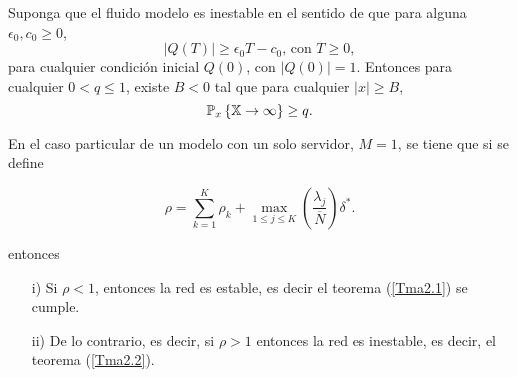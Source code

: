\begin{Teo}\label{Tma2.2}
Suponga que el fluido modelo es inestable en el sentido de que
para alguna $\epsilon_{0},c_{0}\geq0$,
\begin{equation}\label{Eq.Inestability}
|Q\left(T\right)|\geq\epsilon_{0}T-c_{0}\textrm{, con }T\geq0,
\end{equation}
para cualquier condici\'on inicial $Q\left(0\right)$, con
$|Q\left(0\right)|=1$. Entonces para cualquier $0<q\leq1$, existe
$B<0$ tal que para cualquier $|x|\geq B$,
\begin{equation}
\mathbb{P}_{x}\left\{\mathbb{X}\rightarrow\infty\right\}\geq q.
\end{equation}
\end{Teo}

En el caso particular de un modelo con un solo servidor, $M=1$, se
tiene que si se define
\begin{Def}\label{Def.Ro}
\begin{equation}\label{RoM1}
\rho=\sum_{k=1}^{K}\rho_{k}+\max_{1\leq j\leq
K}\left(\frac{\lambda_{j}}{\overline{N}}\right)\delta^{*}.
\end{equation}
\end{Def}
entonces

\begin{Teo}\label{Teo.Down}
\begin{itemize}
\item[i)] Si $\rho<1$, entonces la red es estable, es decir el teorema
(\ref{Tma2.1}) se cumple. \item[ii)] De lo contrario, es decir, si
$\rho>1$ entonces la red es inestable, es decir, el teorema
(\ref{Tma2.2}).
\end{itemize}
\end{Teo}



